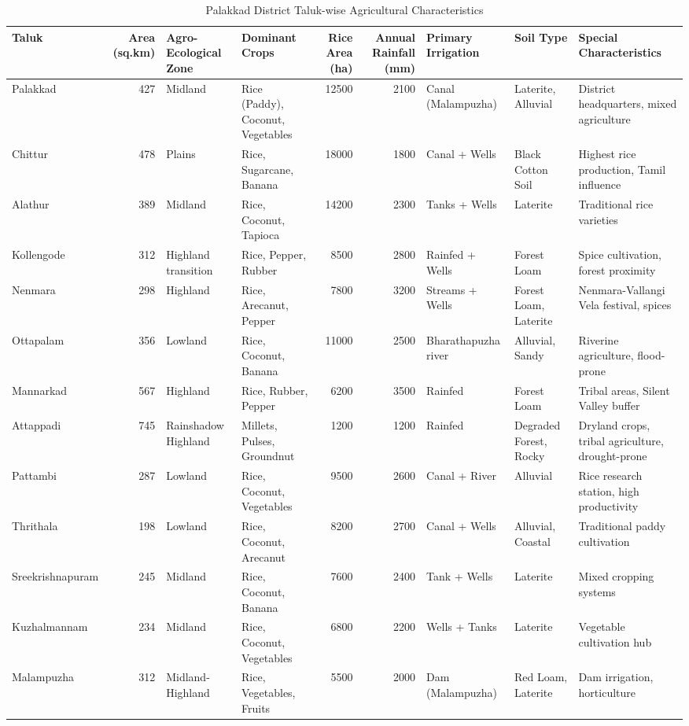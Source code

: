 \begin{table}
\caption{Palakkad District Taluk-wise Agricultural Characteristics}
\label{tab:taluk_characteristics}
\begin{tabular}{lrllrrlll}
\toprule
Taluk & Area (sq.km) & Agro-Ecological Zone & Dominant Crops & Rice Area (ha) & Annual Rainfall (mm) & Primary Irrigation & Soil Type & Special Characteristics \\
\midrule
Palakkad & 427 & Midland & Rice (Paddy), Coconut, Vegetables & 12500 & 2100 & Canal (Malampuzha) & Laterite, Alluvial & District headquarters, mixed agriculture \\
Chittur & 478 & Plains & Rice, Sugarcane, Banana & 18000 & 1800 & Canal + Wells & Black Cotton Soil & Highest rice production, Tamil influence \\
Alathur & 389 & Midland & Rice, Coconut, Tapioca & 14200 & 2300 & Tanks + Wells & Laterite & Traditional rice varieties \\
Kollengode & 312 & Highland transition & Rice, Pepper, Rubber & 8500 & 2800 & Rainfed + Wells & Forest Loam & Spice cultivation, forest proximity \\
Nenmara & 298 & Highland & Rice, Arecanut, Pepper & 7800 & 3200 & Streams + Wells & Forest Loam, Laterite & Nenmara-Vallangi Vela festival, spices \\
Ottapalam & 356 & Lowland & Rice, Coconut, Banana & 11000 & 2500 & Bharathapuzha river & Alluvial, Sandy & Riverine agriculture, flood-prone \\
Mannarkad & 567 & Highland & Rice, Rubber, Pepper & 6200 & 3500 & Rainfed & Forest Loam & Tribal areas, Silent Valley buffer \\
Attappadi & 745 & Rainshadow Highland & Millets, Pulses, Groundnut & 1200 & 1200 & Rainfed & Degraded Forest, Rocky & Dryland crops, tribal agriculture, drought-prone \\
Pattambi & 287 & Lowland & Rice, Coconut, Vegetables & 9500 & 2600 & Canal + River & Alluvial & Rice research station, high productivity \\
Thrithala & 198 & Lowland & Rice, Coconut, Arecanut & 8200 & 2700 & Canal + Wells & Alluvial, Coastal & Traditional paddy cultivation \\
Sreekrishnapuram & 245 & Midland & Rice, Coconut, Banana & 7600 & 2400 & Tank + Wells & Laterite & Mixed cropping systems \\
Kuzhalmannam & 234 & Midland & Rice, Coconut, Vegetables & 6800 & 2200 & Wells + Tanks & Laterite & Vegetable cultivation hub \\
Malampuzha & 312 & Midland-Highland & Rice, Vegetables, Fruits & 5500 & 2000 & Dam (Malampuzha) & Red Loam, Laterite & Dam irrigation, horticulture \\
\bottomrule
\end{tabular}
\end{table}
